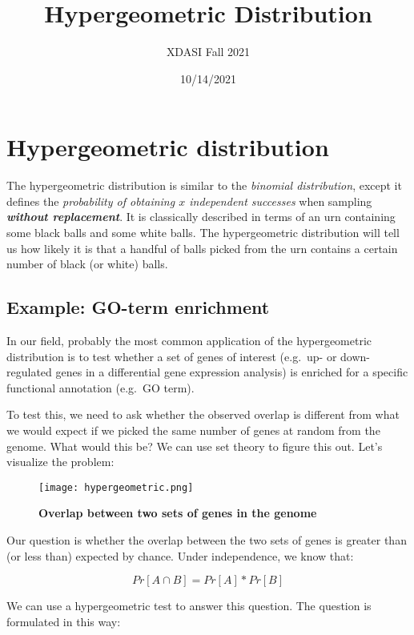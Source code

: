 \documentclass[
]{article}
\title{Hypergeometric Distribution}
\subtitle{XDASI Fall 2021}
\author{}
\date{\vspace{-2.5em}10/14/2021}
\begin{document}
\maketitle

{
\setcounter{tocdepth}{2}
\tableofcontents
}
\hypertarget{hypergeometric-distribution}{%
\section{Hypergeometric
distribution}\label{hypergeometric-distribution}}

The hypergeometric distribution is similar to the \emph{binomial
distribution}, except it defines the \emph{probability of obtaining
\(x\) independent successes} when sampling \emph{\textbf{without
replacement}}. It is classically described in terms of an urn containing
some black balls and some white balls. The hypergeometric distribution
will tell us how likely it is that a handful of balls picked from the
urn contains a certain number of black (or white) balls.

\hypertarget{example-go-term-enrichment}{%
\subsection{Example: GO-term
enrichment}\label{example-go-term-enrichment}}

In our field, probably the most common application of the hypergeometric
distribution is to test whether a set of genes of interest (e.g.~up- or
down-regulated genes in a differential gene expression analysis) is
enriched for a specific functional annotation (e.g.~GO term).

To test this, we need to ask whether the observed overlap is different
from what we would expect if we picked the same number of genes at
random from the genome. What would this be? We can use set theory to
figure this out. Let's visualize the problem:

\begin{figure}
\centering
\texttt{[image: hypergeometric.png]}
\caption{\textbf{Overlap between two sets of genes in the genome}}
\end{figure}

Our question is whether the overlap between the two sets of genes is
greater than (or less than) expected by chance. Under independence, we
know that:

\[Pr[A \cap B] = Pr[A]*Pr[B]\]

We can use a hypergeometric test to answer this question. The question
is formulated in this way:
\end{document}
